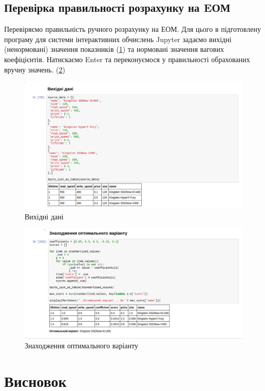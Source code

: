 \subsection{Перевірка правильності розрахунку на EОМ}

Перевіряємо правильність ручного розрахунку на ЕОМ. Для цього в підготовлену програму для системи
інтерактивних обчислень Jupyter задаємо вихідні (ненормовані) значення показників
(\ref{f:source_data}) та нормовані значення вагових коефіцієнтів. Натискаємо Enter та переконуємося
у правильності обрахованих вручну значень. (\ref{f:optimal})
\begin{figure}[!ht]
  \centering
  \includegraphics[width=\linewidth]{images/lab1/source_data.png}
  \caption{Вихідні дані}
  \label{f:source_data} 
\end{figure}
\begin{figure}[!ht]
  \centering
  \includegraphics[width=\linewidth]{images/lab1/optimal.png}
  \caption{Знаходження оптимального варіанту}
  \label{f:optimal} 
\end{figure}

\newpage
\section*{Висновок}

